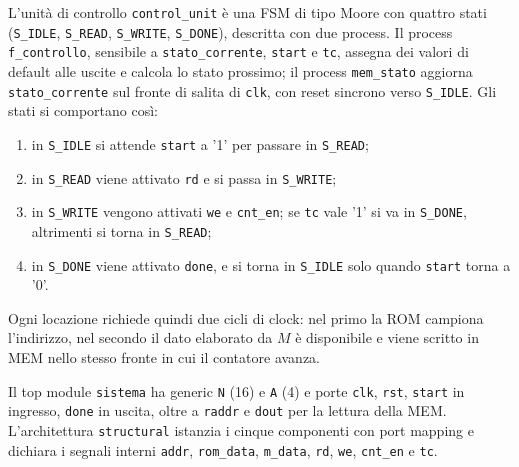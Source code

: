 L'unità di controllo \texttt{control\_unit} è una FSM di tipo Moore con quattro stati (\texttt{S\_IDLE}, \texttt{S\_READ}, \texttt{S\_WRITE}, \texttt{S\_DONE}), descritta con due process. Il process \texttt{f\_controllo}, sensibile a \texttt{stato\_corrente}, \texttt{start} e \texttt{tc}, assegna dei valori di default alle uscite e calcola lo stato prossimo; il process \texttt{mem\_stato} aggiorna \texttt{stato\_corrente} sul fronte di salita di \texttt{clk}, con reset sincrono verso \texttt{S\_IDLE}. Gli stati si comportano così:
\begin{enumerate}
  \item in \texttt{S\_IDLE} si attende \texttt{start} a '1' per passare in \texttt{S\_READ};
  \item in \texttt{S\_READ} viene attivato \texttt{rd} e si passa in \texttt{S\_WRITE};
  \item in \texttt{S\_WRITE} vengono attivati \texttt{we} e \texttt{cnt\_en}; se \texttt{tc} vale '1' si va in \texttt{S\_DONE}, altrimenti si torna in \texttt{S\_READ};
  \item in \texttt{S\_DONE} viene attivato \texttt{done}, e si torna in \texttt{S\_IDLE} solo quando \texttt{start} torna a '0'.
\end{enumerate}
Ogni locazione richiede quindi due cicli di clock: nel primo la ROM campiona l'indirizzo, nel secondo il dato elaborato da $M$ è disponibile e viene scritto in MEM nello stesso fronte in cui il contatore avanza. 


Il top module \texttt{sistema} ha generic \texttt{N} (16) e \texttt{A} (4) e porte \texttt{clk}, \texttt{rst}, \texttt{start} in ingresso, \texttt{done} in uscita, oltre a \texttt{raddr} e \texttt{dout} per la lettura della MEM. L'architettura \texttt{structural} istanzia i cinque componenti con port mapping e dichiara i segnali interni \texttt{addr}, \texttt{rom\_data}, \texttt{m\_data}, \texttt{rd}, \texttt{we}, \texttt{cnt\_en} e \texttt{tc}.


\simulazione

